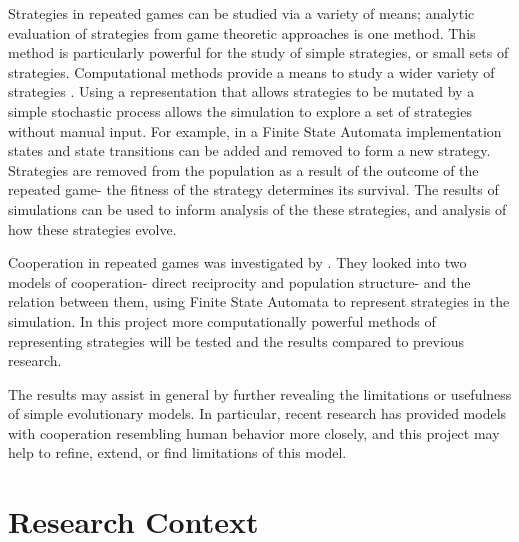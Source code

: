 \documentclass[a4paper,11pt]{article}
\begin{document}
Strategies in repeated games can be studied via a variety of means; analytic evaluation of strategies from game theoretic approaches is one method. 
This method is particularly powerful for the study of simple strategies, or small sets of strategies. 
Computational methods provide a means to study a wider variety of strategies \citep{fogel1993evolving}. 
Using a representation that allows strategies to be mutated by a simple stochastic process allows the simulation to explore a set of strategies without manual input. 
For example, in a Finite State Automata implementation states and state transitions can be added and removed to form a new strategy. 
Strategies are removed from the population as a result of the outcome of the repeated game- the fitness of the strategy determines its survival. 
The results of simulations can be used to inform analysis of the these strategies, and analysis of how these strategies evolve.

Cooperation in repeated games was investigated by \citet{van-veelen:PNAS:2012}. 
They looked into two models of cooperation- direct reciprocity and population structure- and the relation between them, using Finite State Automata to represent strategies in the simulation. 
In this project more computationally powerful methods of representing strategies will be tested and the results compared to previous research.

The results may assist in general by further revealing the limitations or usefulness of simple evolutionary models. 
In particular, recent research has provided models with cooperation resembling human behavior more closely, and this project may help to refine, extend, or find limitations of this model.
\section{Research Context}
\end{document}
